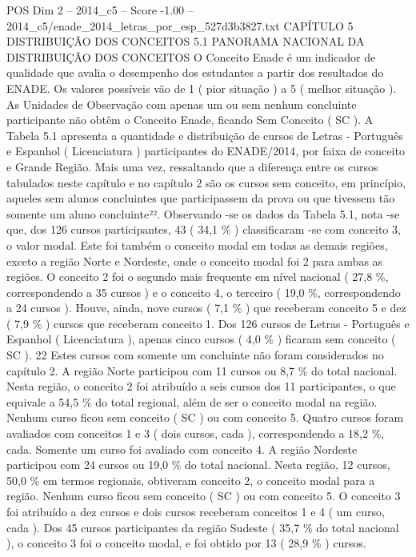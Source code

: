 \begin{textsample}{POS Dim 2 – 2014\_c5 – Score -1.00 – 2014\_c5/enade\_2014\_letras\_por\_esp\_527d3b3827.txt}  \label{ex:f2_pos_313}
CAPÍTULO 5 DISTRIBUIÇÃO DOS CONCEITOS 5.1 PANORAMA NACIONAL DA DISTRIBUIÇÃO DOS CONCEITOS O Conceito Enade é um indicador de qualidade que avalia o desempenho dos estudantes a partir dos resultados do ENADE.
Os valores possíveis vão de 1 ( pior situação ) a 5 ( melhor situação ).
As Unidades de Observação com apenas um ou sem nenhum concluinte participante não obtêm o Conceito Enade, ficando Sem Conceito ( SC ).
A Tabela 5.1 apresenta a quantidade e distribuição de cursos de Letras - Português e Espanhol ( Licenciatura ) participantes do ENADE/2014, por faixa de conceito e Grande Região.
Mais uma vez, ressaltando que a diferença entre os cursos tabulados neste capítulo e no capítulo 2 são os cursos sem conceito, em princípio, aqueles sem alunos concluintes que participassem da prova ou que tivessem tão somente um aluno concluinte²².
Observando -se os dados da Tabela 5.1, nota -se que, dos 126 cursos participantes, 43 ( 34,1 \% ) classificaram -se com conceito 3, o valor modal.
Este foi também o conceito modal em todas as demais regiões, exceto a região Norte e Nordeste, onde o conceito modal foi 2 para ambas as regiões.
O conceito 2 foi o segundo mais frequente em nível nacional ( 27,8 \%, correspondendo a 35 cursos ) e o conceito 4, o terceiro ( 19,0 \%, correspondendo a 24 cursos ).
Houve, ainda, nove cursos ( 7,1 \% ) que receberam conceito 5 e dez ( 7,9 \% ) cursos que receberam conceito 1.
Dos 126 cursos de Letras - Português e Espanhol ( Licenciatura ), apenas cinco cursos ( 4,0 \% ) ficaram sem conceito ( SC ). 22 Estes cursos com somente um concluinte não foram considerados no capítulo 2.
A região Norte participou com 11 cursos ou 8,7 \% do total nacional.
Nesta região, o conceito 2 foi atribuído a seis cursos dos 11 participantes, o que equivale a 54,5 \% do total regional, além de ser o conceito modal na região.
Nenhum curso ficou sem conceito ( SC ) ou com conceito 5.
Quatro cursos foram avaliados com conceitos 1 e 3 ( dois cursos, cada ), correspondendo a 18,2 \%, cada.
Somente um curso foi avaliado com conceito 4.
A região Nordeste participou com 24 cursos ou 19,0 \% do total nacional.
Nesta região, 12 cursos, 50,0 \% em termos regionais, obtiveram conceito 2, o conceito modal para a região.
Nenhum curso ficou sem conceito ( SC ) ou com conceito 5.
O conceito 3 foi atribuído a dez cursos e dois cursos receberam conceitos 1 e 4 ( um curso, cada ).
Dos 45 cursos participantes da região Sudeste ( 35,7 \% do total nacional ), o conceito 3 foi o conceito modal, e foi obtido por 13 ( 28,9 \% ) cursos.

\end{textsample}
